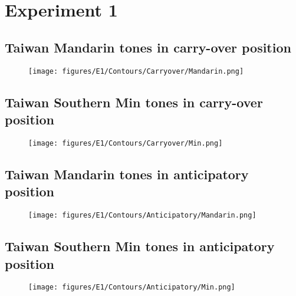 

\section{Experiment 1}\label{Appendix:StimuliforExperiment1}

\subsection{Taiwan Mandarin tones in carry-over position}
\begin{figure}[hbt!]
\centering
\texttt{[image: figures/E1/Contours/Carryover/Mandarin.png]}
\end{figure}

\subsection{Taiwan Southern Min tones in carry-over position}
\begin{figure}[hbt!]
\centering
\texttt{[image: figures/E1/Contours/Carryover/Min.png]}
\end{figure}

\subsection{Taiwan Mandarin tones in anticipatory position}
\begin{figure}[hbt!]
\centering
\texttt{[image: figures/E1/Contours/Anticipatory/Mandarin.png]}
\end{figure}

\subsection{Taiwan Southern Min tones in anticipatory position}
\begin{figure}[hbt!]
\centering
\texttt{[image: figures/E1/Contours/Anticipatory/Min.png]}
\end{figure}